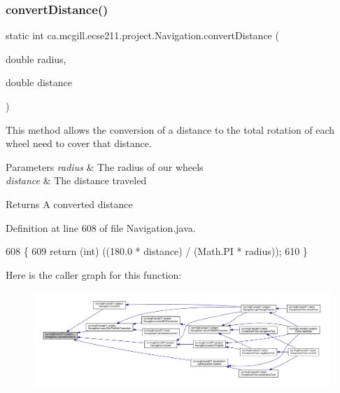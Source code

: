 \subsubsection{\texorpdfstring{convert\+Distance()}{convertDistance()}}
{\footnotesize\ttfamily static int ca.\+mcgill.\+ecse211.\+project.\+Navigation.\+convert\+Distance (\begin{DoxyParamCaption}\item[{double}]{radius,  }\item[{double}]{distance }\end{DoxyParamCaption})\hspace{0.3cm}{\ttfamily [static]}}

This method allows the conversion of a distance to the total rotation of each wheel need to cover that distance.


\begin{DoxyParams}{Parameters}
{\em radius} & The radius of our wheels \\
\hline
{\em distance} & The distance traveled \\
\hline
\end{DoxyParams}
\begin{DoxyReturn}{Returns}
A converted distance 
\end{DoxyReturn}


Definition at line 608 of file Navigation.\+java.


\begin{DoxyCode}
608                                                                     \{
609     \textcolor{keywordflow}{return} (\textcolor{keywordtype}{int}) ((180.0 * distance) / (Math.PI * radius));
610   \}
\end{DoxyCode}
Here is the caller graph for this function\+:\nopagebreak
\begin{figure}[H]
\begin{center}
\leavevmode
\includegraphics[width=350pt]{classca_1_1mcgill_1_1ecse211_1_1project_1_1_navigation_ac9e260bcd619ffa4820d7d0de7ea1c12_icgraph}
\end{center}
\end{figure}
\mbox{\label{classca_1_1mcgill_1_1ecse211_1_1project_1_1_navigation_a7c66610c5b7496ddb35d342ab2cd3f08}} 
